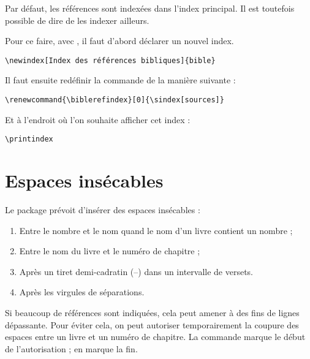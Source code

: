 Par défaut, les références sont indexées dans l'index principal. Il est toutefois possible de dire de les indexer ailleurs.

Pour ce faire, avec , il faut d'abord déclarer un nouvel index.

\begin{verbatim}
\newindex[Index des références bibliques]{bible}
\end{verbatim}

Il faut ensuite redéfinir la commande  de la manière suivante :
\begin{verbatim}
\renewcommand{\biblerefindex}[0]{\sindex[sources]}
\end{verbatim}

Et à l'endroit où l'on souhaite afficher cet index :
\begin{verbatim}
\printindex
\end{verbatim}

\section{Espaces insécables}

Le package  prévoit d'insérer des espaces insécables :
\begin{enumerate}
\item Entre le nombre et le nom quand le nom d’un livre contient un nombre ;
\item Entre le nom du livre et le numéro de chapitre ;
\item Après un tiret demi-cadratin (–) dans un intervalle de versets.
\item Après les virgules de séparations.
\end{enumerate}

Si beaucoup de références sont indiquées, cela peut amener à des fins de lignes dépassante.
Pour éviter cela, on peut autoriser temporairement la coupure des espaces entre un livre et un numéro de chapitre. La commande  marque le début de l'autorisation ;  en marque la fin.

